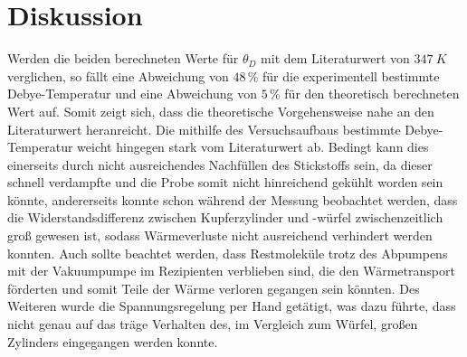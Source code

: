 \section{Diskussion}
Werden die beiden berechneten Werte für $\theta_D$ mit dem Literaturwert von $\SI{347}{K}$ verglichen, so fällt eine Abweichung von $48\,\%$ für die experimentell bestimmte Debye-Temperatur und
eine Abweichung von $5\,\%$ für den theoretisch berechneten Wert auf.
Somit zeigt sich, dass die theoretische Vorgehensweise nahe an den Literaturwert heranreicht.
Die mithilfe des Versuchsaufbaus bestimmte Debye-Temperatur weicht hingegen stark vom Literaturwert ab.
Bedingt kann dies einerseits durch nicht ausreichendes Nachfüllen des Stickstoffs sein, da dieser schnell verdampfte und die Probe somit nicht hinreichend gekühlt worden sein könnte,
andererseits konnte schon während der Messung beobachtet werden, dass die Widerstandsdifferenz zwischen Kupferzylinder und -würfel zwischenzeitlich groß gewesen ist, sodass Wärmeverluste nicht ausreichend
verhindert werden konnten.
Auch sollte beachtet werden, dass Restmoleküle trotz des Abpumpens mit der Vakuumpumpe im Rezipienten verblieben sind, die den Wärmetransport förderten und somit Teile der Wärme verloren gegangen sein könnten.
Des Weiteren wurde die Spannungsregelung per Hand getätigt, was dazu führte, dass nicht genau auf das träge Verhalten des, im Vergleich zum Würfel, großen Zylinders eingegangen werden konnte.
